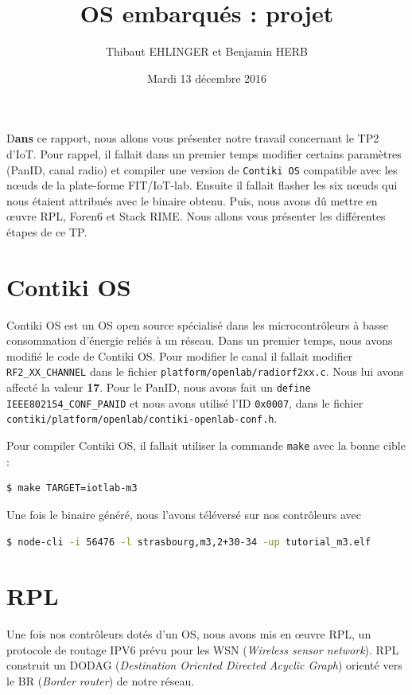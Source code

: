 \documentclass[	DIV=calc,%
							paper=a4,%
							fontsize=11pt,%
			  ]{scrartcl}	 					%
\title{OS embarqués : projet}					%
\author{Thibaut EHLINGER et Benjamin HERB }											%
\date{Mardi 13 décembre 2016}
\newcommand{\initial}[1]{%
     \lettrine[lines=3,lhang=0.3,nindent=0em]{
     				\color{DarkGoldenrod}
     				{\textsf{#1}}}{}}
\begin{document}
\maketitle
\thispagestyle{fancy} 			%

\initial{D}\textbf{ans} ce rapport, nous allons vous présenter notre travail concernant le TP2 d'IoT. Pour rappel, il fallait dans un premier temps modifier  certains paramètres (PanID, canal radio) et compiler une version de \texttt{Contiki OS} compatible avec les nœuds de la plate-forme FIT/IoT-lab. Ensuite il fallait flasher les six nœuds qui nous étaient attribués avec le binaire obtenu. Puis, nous avons dû mettre en œuvre RPL, Foren6 et Stack RIME.  Nous allons vous présenter les différentes étapes de ce TP.


\section{Contiki OS}
Contiki OS est un OS open source spécialisé dans les microcontrôleurs à basse consommation d'énergie reliés à un réseau. Dans un premier temps, nous avons modifié le code de Contiki OS. Pour modifier le canal il fallait modifier \texttt{RF2\_XX\_CHANNEL} dans le fichier \texttt{platform/openlab/radiorf2xx.c}. Nous lui avons affecté la valeur \textbf{17}. Pour le PanID, nous avons fait un \texttt{define IEEE802154\_CONF\_PANID} et nous avons utilisé l'ID \texttt{0x0007}, dans le fichier 
\texttt{contiki/platform/openlab/contiki-openlab-conf.h}.

Pour compiler Contiki OS, il fallait utiliser la commande \texttt{make} avec la bonne cible :
\begin{lstlisting}[language=bash]
$ make TARGET=iotlab-m3
\end{lstlisting}

Une fois le binaire généré, nous l'avons téléversé sur nos contrôleurs avec 
\begin{lstlisting}[language=bash]
$ node-cli -i 56476 -l strasbourg,m3,2+30-34 -up tutorial_m3.elf
\end{lstlisting}

\section{RPL}
Une fois nos contrôleurs dotés d'un OS, nous avons mis en œuvre RPL, un protocole de routage IPV6 prévu pour les WSN (\textit{Wireless sensor network}). RPL construit un DODAG (\textit{Destination Oriented Directed Acyclic Graph}) orienté vers le BR (\textit{Border router}) de notre réseau.
\end{document}
